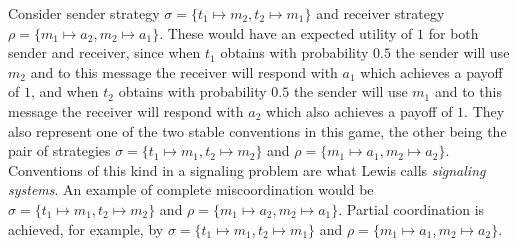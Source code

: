 \documentclass[a4paper]{article}
\begin{document}
Consider sender strategy $\sigma = \lbrace t_1 \mapsto m_2, t_2 \mapsto m_1 \rbrace$ and receiver strategy $\rho = \lbrace m_1 \mapsto a_2, m_2 \mapsto a_1 \rbrace$.
These would have an expected utility of $1$ for both sender and receiver, since when $t_1$ obtains with probability $0.5$ the sender will use $m_2$ and to this message the receiver will respond with $a_1$ which achieves a payoff of $1$, and when $t_2$ obtains with probability $0.5$ the sender will use $m_1$ and to this message the receiver will respond with $a_2$ which also achieves a payoff of $1$.
They also represent one of the two stable conventions in this game, the other being the pair of strategies $\sigma = \lbrace t_1 \mapsto m_1, t_2 \mapsto m_2 \rbrace$ and $\rho = \lbrace m_1 \mapsto a_1, m_2 \mapsto a_2 \rbrace$.
Conventions of this kind in a signaling problem are what Lewis calls \emph{signaling systems}.
An example of complete miscoordination would be $\sigma = \lbrace t_1 \mapsto m_1, t_2 \mapsto m_2 \rbrace$ and $\rho = \lbrace m_1 \mapsto a_2, m_2 \mapsto a_1 \rbrace$.
Partial coordination is achieved, for example, by $\sigma = \lbrace t_1 \mapsto m_1, t_2 \mapsto m_1 \rbrace$ and $\rho = \lbrace m_1 \mapsto a_1, m_2 \mapsto a_2 \rbrace$.

\end{document}
